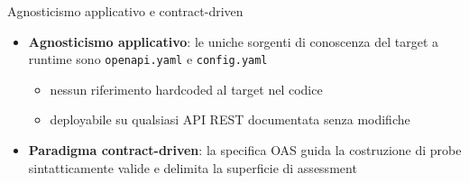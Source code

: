 
\begin{frame}{Agnosticismo applicativo e contract-driven}
  \begin{itemize}
    \item \textbf{Agnosticismo applicativo}: le uniche sorgenti di conoscenza del target a runtime sono \alert{\texttt{openapi.yaml}} e \alert{\texttt{config.yaml}}
          \begin{itemize}
            \item nessun riferimento hardcoded al target nel codice
            \item deployabile su \alert{qualsiasi API REST documentata} senza modifiche
          \end{itemize}

    \item \textbf{Paradigma contract-driven}: la specifica \alert{OAS} guida la costruzione di probe \alert{sintatticamente valide} e delimita la superficie di assessment
  \end{itemize}
\end{frame}